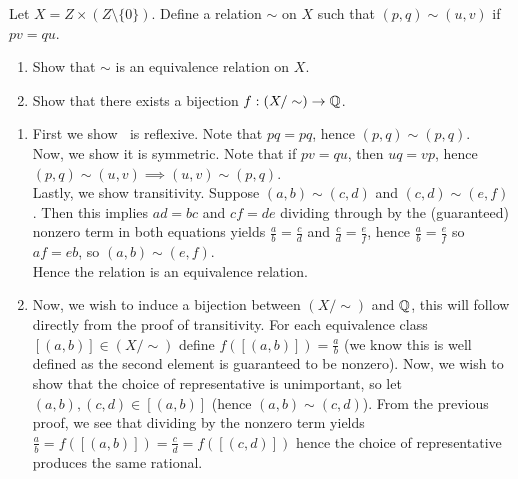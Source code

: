 \documentclass[a4paper]{article}
\begin{document}
\newpage
\begin{problem}
	Let \(X = Z \times \left( Z \setminus \{0\}  \right) \). Define a relation \(\sim\) on \(X\) such that \(\left( p, q \right) \sim \left( u, v \right) \) if \(pv = qu\).
	\begin{enumerate}
		\item Show that \(\sim\) is an equivalence relation on \(X\).\\
		\item Show that there exists a bijection \(f: \left( X / \sim \right) \to \mathbb{Q}\).
	\end{enumerate}
\end{problem}
\begin{solution}
\begin{enumerate}
	\item First we show \(~\) is reflexive. Note that \(pq = pq\), hence \(\left( p, q \right) \sim \left( p, q \right) \).\\
		Now, we show it is symmetric. Note that if \(pv = qu\), then \(uq=vp\), hence \(\left( p, q \right) \sim \left( u,  v \right) \implies \left( u, v \right) \sim \left( p, q \right)  \).\\
		Lastly, we show transitivity. Suppose \(\left( a, b \right) \sim \left( c, d \right) \) and \(\left( c, d \right) \sim \left( e, f \right) \). Then this implies \(ad=bc\) and \(cf=de\) dividing through by the (guaranteed) nonzero term in both equations yields \(\frac{a}{b} = \frac{c}{d}\) and \(\frac{c}{d}= \frac{e}{f}\), hence \(\frac{a}{b} = \frac{e}{f}\) so \(af = eb\), so \(\left( a, b \right) \sim \left( e, f \right) \).\\
		Hence the relation is an equivalence relation.
	\item Now, we wish to induce a bijection between \(\left( X / \sim \right) \) and \(\mathbb{Q}\), this will follow directly from the proof of transitivity. For each equivalence class \( \left[ \left( a, b \right)  \right] \in \left( X / \sim \right) \) define \(f \left( \left[ \left( a, b \right)  \right]  \right) = \frac{a}{b}\) (we know this is well defined as the second element is guaranteed to be nonzero). Now, we wish to show that the choice of representative is unimportant, so let \(\left( a, b \right) , \left( c, d \right) \in \left[ \left( a, b \right)  \right] \) (hence \(\left( a, b \right) \sim \left( c, d \right) \)). From the previous proof, we see that dividing by the nonzero term yields \(\frac{a}{b} = f\left( \left[ \left( a, b \right)  \right]  \right)  =  \frac{c}{d} = f\left( \left[ \left( c, d \right)  \right]  \right) \) hence the choice of representative produces the same rational.\\

\end{enumerate}
\end{solution}
\end{document}
